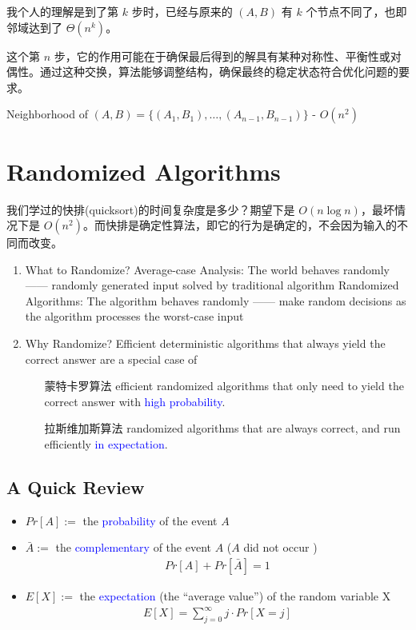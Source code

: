 \documentclass{article}
\begin{document}
我个人的理解是到了第 $k$ 步时，已经与原来的 $(A,B)$ 有 $k$ 个节点不同了，也即邻域达到了 $\Theta (n^k)$。

这个第 $n$ 步，它的作用可能在于确保最后得到的解具有某种对称性、平衡性或对偶性。通过这种交换，算法能够调整结构，确保最终的稳定状态符合优化问题的要求。

Neighborhood of $(A, B) = \{ (A_1, B_1), \dots, (A_{n-1}, B_{n-1}) \}$ - $O(n^2)$

\newpage

\section{Randomized Algorithms}

我们学过的快排(quicksort)的时间复杂度是多少？期望下是 $O(n \log n)$，最坏情况下是 $O(n^2)$。而快排是确定性算法，即它的行为是确定的，不会因为输入的不同而改变。

\begin{enumerate}\small
    \item What to Randomize?
    \subitem Average-case Analysis: The world behaves randomly —— randomly generated input solved by traditional algorithm
    \subitem Randomized Algorithms: The algorithm behaves randomly —— make random decisions as the algorithm processes the worst-case input
    \item Why Randomize?
    \subitem Efficient deterministic algorithms that always yield the correct answer are a special case of 
    \begin{itemize}
        \item [蒙特卡罗算法] efficient randomized algorithms that only need to yield the correct answer with \textcolor{blue}{high probability}. 
        \item [拉斯维加斯算法] randomized algorithms that are always correct, and run efficiently \textcolor{blue}{in expectation}. 
    \end{itemize}
\end{enumerate}

\subsection{A Quick Review}
\begin{itemize}
    \item $Pr[A]:=$ the \textcolor{blue}{probability} of the event $A$
    \item $\bar{A}:=$ the \textcolor{blue}{complementary} of the event $A$ ($A$ did not occur )
    \begin{align*}
        Pr[A]+Pr[\bar{A}]=1
    \end{align*}
    \item $E[X]:=$ the \textcolor{blue}{expectation} (the ``average value'') of the random variable X
    \begin{align*}
        E[X]=\sum_{j=0}^\infty j \cdot Pr[X=j]
    \end{align*}
\end{itemize}
\end{document}
